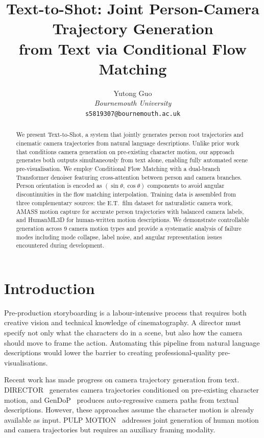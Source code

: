 \documentclass[10pt,twocolumn,letterpaper]{article}
\title{\textbf{Text-to-Shot: Joint Person-Camera Trajectory Generation\\from Text via Conditional Flow Matching}}
\author{
Yutong Guo\\
\textit{Bournemouth University}\\
\texttt{s5819307@bournemouth.ac.uk}
}
\date{}
\begin{document}
\maketitle

\begin{abstract}
We present Text-to-Shot, a system that jointly generates person root trajectories and cinematic camera trajectories from natural language descriptions. Unlike prior work that conditions camera generation on pre-existing character motion, our approach generates both outputs simultaneously from text alone, enabling fully automated scene pre-visualisation. We employ Conditional Flow Matching with a dual-branch Transformer denoiser featuring cross-attention between person and camera branches. Person orientation is encoded as $(\sin\theta, \cos\theta)$ components to avoid angular discontinuities in the flow matching interpolation. Training data is assembled from three complementary sources: the E.T.\ film dataset for naturalistic camera work, AMASS motion capture for accurate person trajectories with balanced camera labels, and HumanML3D for human-written motion descriptions. We demonstrate controllable generation across 9 camera motion types and provide a systematic analysis of failure modes including mode collapse, label noise, and angular representation issues encountered during development.
\end{abstract}

\section{Introduction}

Pre-production storyboarding is a labour-intensive process that requires both creative vision and technical knowledge of cinematography. A director must specify not only what the characters do in a scene, but also how the camera should move to frame the action. Automating this pipeline from natural language descriptions would lower the barrier to creating professional-quality pre-visualisations.

Recent work has made progress on camera trajectory generation from text. DIRECTOR~\cite{courant2024et} generates camera trajectories conditioned on pre-existing character motion, and GenDoP~\cite{gendop2025} produces auto-regressive camera paths from textual descriptions. However, these approaches assume the character motion is already available as input. PULP MOTION~\cite{pulpmotion2025} addresses joint generation of human motion and camera trajectories but requires an auxiliary framing modality.
\end{document}
